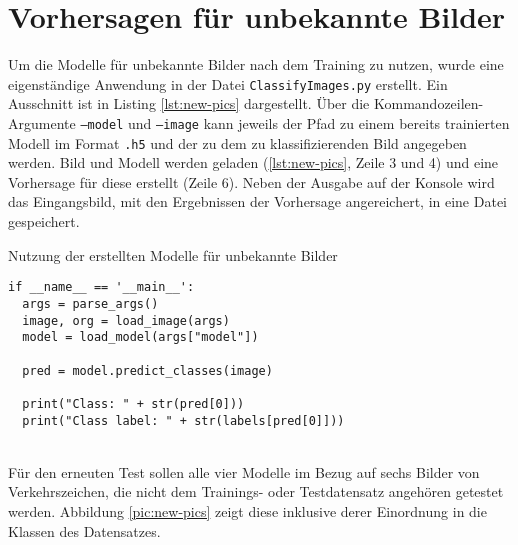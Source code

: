 \section{Vorhersagen für unbekannte Bilder}
Um die Modelle für unbekannte Bilder nach dem Training zu nutzen, wurde eine eigenständige Anwendung in der Datei \texttt{ClassifyImages.py} erstellt. Ein Ausschnitt ist in Listing \ref{lst:new-pics} dargestellt. Über die Kommandozeilen-Argumente \texttt{--model} und \texttt{--image} kann jeweils der Pfad zu einem bereits trainierten Modell im Format \texttt{.h5} und der zu dem zu klassifizierenden Bild angegeben werden. Bild und Modell werden geladen (\ref{lst:new-pics}, Zeile 3 und 4) und eine Vorhersage für diese erstellt (Zeile 6). Neben der Ausgabe auf der Konsole wird das Eingangsbild, mit den Ergebnissen der Vorhersage angereichert, in eine Datei gespeichert.

\begin{listing} [ht]
	\caption{Nutzung der erstellten Modelle für unbekannte Bilder}
	\label{lst:new-pics}
	\begin{verbatim}
if __name__ == '__main__':
  args = parse_args()
  image, org = load_image(args)
  model = load_model(args["model"])

  pred = model.predict_classes(image)

  print("Class: " + str(pred[0]))
  print("Class label: " + str(labels[pred[0]]))
	\end{verbatim}
\end{listing} \ \\
%
Für den erneuten Test sollen alle vier Modelle im Bezug auf sechs Bilder von Verkehrszeichen, die nicht dem Trainings- oder Testdatensatz angehören getestet werden. Abbildung \ref{pic:new-pics} zeigt diese inklusive derer Einordnung in die Klassen des Datensatzes.

